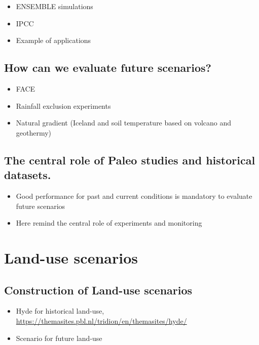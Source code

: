 \documentclass[
  oneside]{book}
\providecommand{\tightlist}{%
  \setlength{\itemsep}{0pt}\setlength{\parskip}{0pt}}
\begin{document}
\begin{itemize}
\tightlist
\item
  ENSEMBLE simulations
\item
  IPCC
\item
  Example of applications
\end{itemize}

\hypertarget{how-can-we-evaluate-future-scenarios}{%
\subsection{How can we evaluate future scenarios?}\label{how-can-we-evaluate-future-scenarios}}

\begin{itemize}
\tightlist
\item
  FACE
\item
  Rainfall exclusion experiments
\item
  Natural gradient (Iceland and soil temperature based on volcano and geothermy)
\end{itemize}

\hypertarget{the-central-role-of-paleo-studies-and-historical-datasets.}{%
\subsection{The central role of Paleo studies and historical datasets.}\label{the-central-role-of-paleo-studies-and-historical-datasets.}}

\begin{itemize}
\tightlist
\item
  Good performance for past and current conditions is mandatory to evaluate future scenarios
\item
  Here remind the central role of experiments and monitoring
\end{itemize}

\hypertarget{land-use-scenarios}{%
\section{Land-use scenarios}\label{land-use-scenarios}}

\hypertarget{construction-of-land-use-scenarios}{%
\subsection{Construction of Land-use scenarios}\label{construction-of-land-use-scenarios}}

\begin{itemize}
\tightlist
\item
  Hyde for historical land-use, \url{https://themasites.pbl.nl/tridion/en/themasites/hyde/}
\item
  Scenario for future land-use
\end{itemize}
\end{document}
